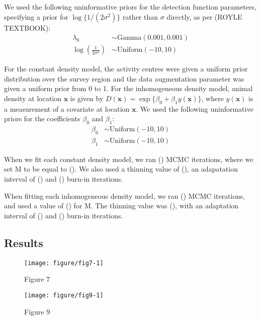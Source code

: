 \documentclass[10pt,a4paper]{article}\usepackage[]{graphicx}\usepackage[]{color}
\makeatletter
\def\maxwidth{ %
  \ifdim\Gin@nat@width>\linewidth
    \linewidth
  \else
    \Gin@nat@width
  \fi
}
\newenvironment{knitrout}{}{} %
\makeatother
\begin{document}
We used the following uninformative priors for the detection function
parameters, specifying a prior for $\log\{1/(2\sigma^2)\}$ rather than
$\sigma$ directly, as per (ROYLE TEXTBOOK):
\begin{align*}
  \lambda_0 &\sim \text{Gamma}(0.001, 0.001) \\ 
  \log\left(\frac{1}{2\sigma^2}\right) &\sim \text{Uniform}(-10, 10)
\end{align*}

For the constant density model, the activity centres were given a
uniform prior distribution over the survey region and the data
augmentation parameter was given a uniform prior from 0 to 1. For the
inhomogeneous density model, animal density at location $\bm{x}$ is
given by $D(\bm{x}) = \exp\{\beta_0 + \beta_1 y(\bm{x})\}$, where
$y(\bm{x})$ is a measurement of a covariate at location $\bm{x}$. We
used the following uninformative priors for the coefficients $\beta_0$
and $\beta_1$:
\begin{align*}
\beta_0 &\sim \text{Uniform}(-10, 10) \\
\beta_1 &\sim \text{Uniform}(-10, 10)
\end{align*}

When we fit each constant density model, we ran () MCMC iterations,
where we set M to be equal to (). We also used a thinning value of (),
an adapatation interval of () and () burn-in iterations.

When fitting each inhomogeneous density model, we ran () MCMC iterations,
and used a value of () for M. The thinning value was (), with an adaptation
interval of () and () burn-in iterations.

\subsection{Results}
\label{sec:appendix-results}

\begin{knitrout}
\color{fgcolor}\begin{figure}
\texttt{[image: figure/fig7-1]} \caption[Figure 7]{Figure 7}\label{fig:fig7}
\end{figure}


\end{knitrout}

\begin{knitrout}
\color{fgcolor}\begin{figure}
\texttt{[image: figure/fig9-1]} \caption[Figure 9]{Figure 9}\label{fig:fig9}
\end{figure}


\end{knitrout}
\end{document}
